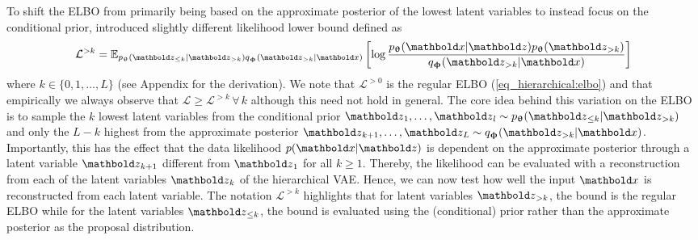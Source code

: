 {To shift the ELBO from primarily being based on the approximate posterior of the lowest latent variables to instead focus on the conditional prior, \textcite{maaloe_biva_2019} introduced slightly different likelihood lower bound defined as
\begin{equation}\label{eq_hierarchical:biva->k}
    \mathcal{L}^{>k} = \mathbb{E}_{p_\thetab(\zb_{\leq k}|\zb_{>k}) q_\phib(\zb_{>k}|\xb)} \left[ \log \frac{p_\thetab(\xb|\zb)p_\thetab(\zb_{>k})}{q_\phib(\zb_{>k}|\xb)} \right]
\end{equation}
where $k\in\{0,1,\dots,L\}$ (see Appendix for the derivation).
We note that $\mathcal{L}^{>0}$ is the regular ELBO (\cref{eq_hierarchical:elbo}) and that empirically we always observe that $\mathcal{L}\geq\mathcal{L}^{>k} \, \forall \, k$ although this need not hold in general.
The core idea behind this variation on the ELBO is to sample the $k$ lowest latent variables from the conditional prior $\zb_1,\dots,\zb_l \sim p_\thetab(\zb_{\leq k}|\zb_{>k})$ and only the $L-k$ highest from the approximate posterior $\zb_{k+1},\dots,\zb_L \sim q_\phib(\zb_{>k}|\xb)$.
Importantly, this has the effect that the data likelihood $p(\xb|\zb)$ is dependent on the approximate posterior through a latent variable $\zb_{k+1}$ different from $\zb_1$ for all $k \geq 1$.
Thereby, the likelihood can be evaluated with a reconstruction from each of the latent variables $\zb_k$ of the hierarchical VAE.
Hence, we can now test how well the input $\xb$ is reconstructed from each latent variable.
The notation $\mathcal{L}^{>k}$ highlights that for latent variables $\zb_{>k}$, the bound is the regular ELBO while for the latent variables $\zb_{\leq k}$, the bound is evaluated using the (conditional) prior rather than the approximate posterior as the proposal distribution.


}
